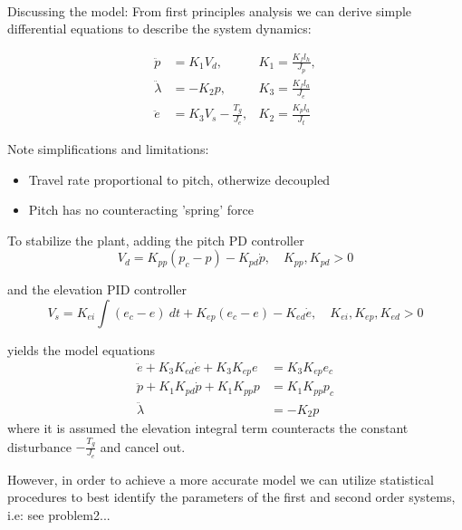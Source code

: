 \paragraph{}
Discussing the model: From first principles analysis we can derive simple differential equations to describe the system dynamics:

\begin{subequations}
	\label{eq:dynamics}
	\begin{align}
		\ddot{p} &= K_1 V_d, &K_1 = \frac{K_f l_h}{J_p},\\
		\ddot{\lambda} &= -K_2 p, &K_3 = \frac{K_f l_a}{J_e}\\
		\ddot{e} &= K_3 V_s - \frac{T_g}{J_e}, &K_2 = \frac{K_p l_a}{J_t}
	\end{align}
\end{subequations}
\begin{equation*}
\end{equation*}

Note simplifications and limitations:
\begin{itemize}
	\item{Travel rate proportional to pitch, otherwize decoupled}
	\item{Pitch has no counteracting 'spring' force}
\end{itemize}

To stabilize the plant, adding the pitch PD controller
\begin{equation*}
	V_d = K_{pp} (p_c - p) - K_{pd} \dot{p}, \quad K_{pp}, K_{pd} > 0
\end{equation*}

and the elevation PID controller
\begin{equation*}
	V_s = K_{ei} \int (e_c - e) \ dt +  K_{ep} (e_c - e) - K_{ed} \dot{e}, \quad K_{ei}, K_{ep}, K_{ed} > 0
\end{equation*}

yields the model equations
\begin{subequations}
\label{eq:model}
\begin{align}
	\ddot{e} + K_{3} K_{ed} \dot{e} + K_{3} K_{ep} e &= K_{3} K_{ep} e_{c} \label{eq:model_se_al_elev} \\
	\ddot{p} + K_{1} K_{pd} \dot{p} + K_{1} K_{pp} p &= K_{1} K_{pp} p_{c} \label{eq:model_se_al_pitch} \\
	\ddot{\lambda} &= -K_{2} p \label{eq:model_se_al_r} 
\end{align}
\end{subequations}
where it is assumed the elevation integral term counteracts the constant disturbance $-\frac{T_g}{J_e}$ and cancel out.

However, in order to achieve a more accurate model we can utilize statistical procedures to best identify the parameters of the first and second order systems, i.e: see problem2...

